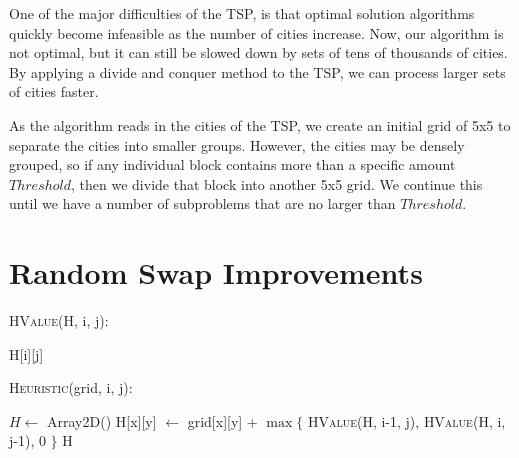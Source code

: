 \documentclass[12pt,letterpaper]{article}
\begin{document}
One of the major difficulties of the TSP, is that optimal solution algorithms quickly become infeasible as the number of cities increase. Now, our algorithm is not optimal, but it can still be slowed down by sets of tens of thousands of cities. By applying a divide and conquer method to the TSP, we can process larger sets of cities faster.

As the algorithm reads in the cities of the TSP, we create an initial grid of 5x5 to separate the cities into smaller groups. However, the cities may be densely grouped, so if any individual block contains more than a specific amount $Threshold$, then we divide that block into another 5x5 grid. We continue this until we have a number of subproblems that are no larger than $Threshold$. 

\section*{Random Swap Improvements}


\textsc{HValue}(H, i, j):
\begin{algorithmic}
    \State {}
\Else
    \State \Return H[i][j]
\EndIf
\end{algorithmic}

\textsc{Heuristic}(grid, i, j):
\begin{algorithmic}
\State $H \gets$ Array2D()
        \State H[x][y] $\gets$ grid[x][y] + $\max \{$ \textsc{HValue}(H, i-1, j), \textsc{HValue}(H, i, j-1), 0  $\}$
    \EndFor
\EndFor
\State \Return H
\end{algorithmic}

\newpage
\end{document}
